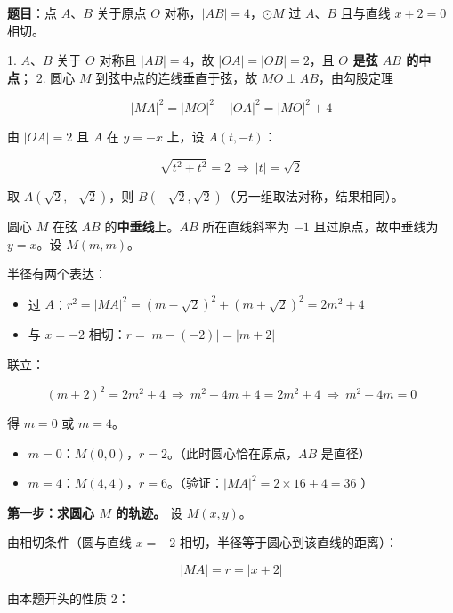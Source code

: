 
\textbf{题目}：点 $A$、$B$ 关于原点 $O$ 对称，$|AB|=4$，$\odot M$ 过 $A$、$B$ 且与直线 $x+2=0$ 相切。


1. $A$、$B$ 关于 $O$ 对称且 $|AB|=4$，故 $|OA|=|OB|=2$，且 \textbf{$O$ 是弦 $AB$ 的中点}；
2. 圆心 $M$ 到弦中点的连线垂直于弦，故 $MO\perp AB$，由勾股定理

\[|MA|^{2}=|MO|^{2}+|OA|^{2}=|MO|^{2}+4\]


由 $|OA|=2$ 且 $A$ 在 $y=-x$ 上，设 $A(t,-t)$：

\[\sqrt{t^{2}+t^{2}}=2\ \Longrightarrow\ |t|=\sqrt2\]

取 $A\left(\sqrt2,-\sqrt2\right)$，则 $B\left(-\sqrt2,\sqrt2\right)$（另一组取法对称，结果相同）。

圆心 $M$ 在弦 $AB$ 的\textbf{中垂线}上。$AB$ 所在直线斜率为 $-1$ 且过原点，故中垂线为 $y=x$。设 $M(m,m)$。

半径有两个表达：

\begin{itemize}
\item 过 $A$：$r^{2}=|MA|^{2}=\left(m-\sqrt2\right)^{2}+\left(m+\sqrt2\right)^{2}=2m^{2}+4$
\item 与 $x=-2$ 相切：$r=|m-(-2)|=|m+2|$
\end{itemize}

联立：

\[(m+2)^{2}=2m^{2}+4\ \Longrightarrow\ m^{2}+4m+4=2m^{2}+4\ \Longrightarrow\ m^{2}-4m=0\]

得 $m=0$ 或 $m=4$。

\begin{itemize}
\item $m=0$：$M(0,0)$，$r=2$。（此时圆心恰在原点，$AB$ 是直径）
\item $m=4$：$M(4,4)$，$r=6$。（验证：$|MA|^{2}=2\times16+4=36$ ）
\end{itemize}



\textbf{第一步：求圆心 $M$ 的轨迹。} 设 $M(x,y)$。

由相切条件（圆与直线 $x=-2$ 相切，半径等于圆心到该直线的距离）：

\[|MA|=r=|x+2|\]

由本题开头的性质 2：

